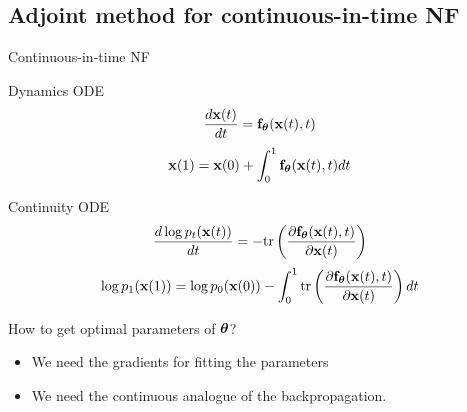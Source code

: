\documentclass{beamer}
\begin{document}
\subsection{Adjoint method for continuous-in-time NF}
\begin{frame}{Continuous-in-time NF}
	\begin{block}{Dynamics ODE}
		\vspace{-0.3cm}
		\[
			 \frac{d \mathbf{x}(t)}{dt} = \mathbf{f}_{\boldsymbol{\theta}}(\mathbf{x}(t), t) 	 
 		\]
 		\[
			 \mathbf{x}(1) = \mathbf{x}(0) + \int_{0}^{1} \mathbf{f}_{\boldsymbol{\theta}}(\mathbf{x}(t), t) dt 
		\]
		\vspace{-0.5cm}
	\end{block}
	\begin{block}{Continuity ODE}
		\vspace{-0.2cm}
		\[
				\frac{d \log p_t(\mathbf{x}(t))}{d t} = - \text{tr} \left( \frac{\partial \mathbf{f}_{\boldsymbol{\theta}}(\mathbf{x}(t), t)}{\partial \mathbf{x}(t)} \right) 
 		\]
 		\[
				\log p_1(\mathbf{x}(1)) = \log p_0(\mathbf{x}(0)) - \int_{0}^{1} \text{tr} \left( \frac{\partial \mathbf{f}_{\boldsymbol{\theta}}(\mathbf{x}(t), t)}{\partial \mathbf{x}(t)} \right) dt
		\]
		\vspace{-0.3cm}
	\end{block}
	\begin{block}{How to get optimal parameters of $\boldsymbol{\theta}$?}
		\begin{itemize}
			\item We need the gradients for fitting the parameters
			\item We need the continuous analogue of the backpropagation.
		\end{itemize}
	\end{block}
	
\end{frame}
\end{document}
